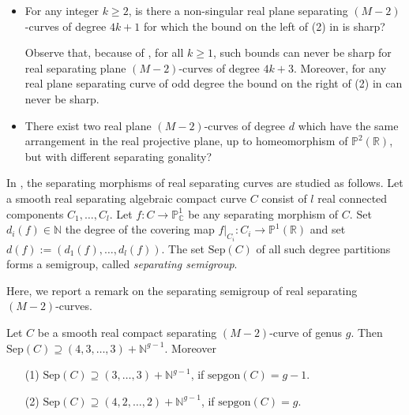 \begin{que}
\begin{itemize}
\item[]
	\item For any integer $k \geq 2$, is there a non-singular real plane separating $(M-2)$-curves of degree $4k+1$ for which the bound on the left of (2) in \cite[Theorem 1.1]{Orev21} is sharp?

Observe that, because of \cite[Remark 1.8]{Orev21}, for all $k \geq 1$, such bounds can never be sharp for real separating plane $(M-2)$-curves of degree $4k+3$. Moreover, for any real plane separating curve of odd degree the bound on the right of (2) in \cite[Theorem 1.1]{Orev21} can never be sharp.
	\end{itemize}
	\begin{itemize}
\item There exist two real plane $(M-2)$-curves of degree $d$ which have the same arrangement in the real projective plane, up to homeomorphism of $\mathbb P^2 (\mathbb R)$, but with different separating gonality?
	\end{itemize}
\end{que}



In \cite{KumShaw20}, the separating morphisms of real separating curves are studied as follows. Let a smooth real separating algebraic compact curve $C$ consist of $l$ real connected components $C_1, \dots, C_l$. Let $f: C \rightarrow \mathbb P^1_{\mathbb C}$ be any separating morphism of $C$. Set $d_i(f) \in \mathbb N$ the degree of the covering map $f|_{C_i}: C_i \rightarrow \mathbb P^1 (\mathbb R ) $ and set $d(f):=(d_1(f), \dots, d_l(f))$. The set $\text{Sep}(C)$ of all such degree partitions forms a semigroup, called \textit{separating semigroup}.


Here, we report a remark on the separating semigroup of real separating $(M-2)$-curves.
\begin{lem}
	\label{lem: sep_semigroup_m-2}
Let $C$ be a smooth real compact separating $(M-2)$-curve of genus $g$. Then $\text{Sep}(C) \supseteq (4,3,\dots,3)+\mathbb N^{g-1}$. Moreover
\begin{enumerate}
	\item[(1)] $\text{Sep}(C) \supseteq (3,\dots,3)+\mathbb N^{g-1}$, if $\text{sepgon}(C)=g-1$.
	\item[(2)] $\text{Sep}(C) \supseteq (4,2,\dots,2)+\mathbb N^{g-1}$, if $\text{sepgon}(C)=g$.
\end{enumerate}

\end{lem}

